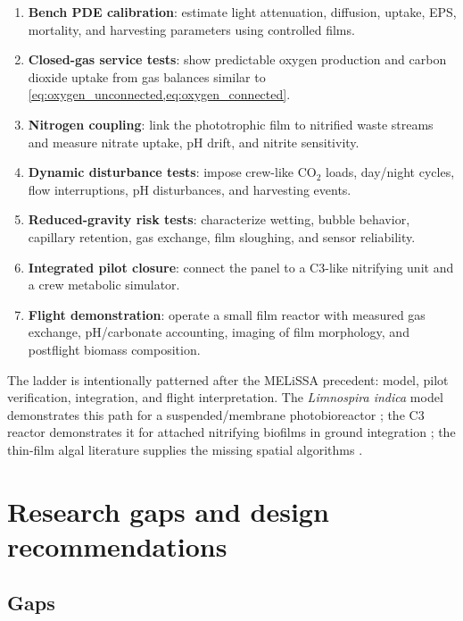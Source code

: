 \documentclass[11pt]{article}
\newcommand{\MEL}{MELiSSA}
\newcommand{\Limno}{\textit{Limnospira indica}}
\begin{document}
\begin{enumerate}
  \item \textbf{Bench PDE calibration}: estimate light attenuation, diffusion, uptake, EPS, mortality, and harvesting parameters using controlled films.
  \item \textbf{Closed-gas service tests}: show predictable oxygen production and carbon dioxide uptake from gas balances similar to \cref{eq:oxygen_unconnected,eq:oxygen_connected}.
  \item \textbf{Nitrogen coupling}: link the phototrophic film to nitrified waste streams and measure nitrate uptake, pH drift, and nitrite sensitivity.
  \item \textbf{Dynamic disturbance tests}: impose crew-like CO$_2$ loads, day/night cycles, flow interruptions, pH disturbances, and harvesting events.
  \item \textbf{Reduced-gravity risk tests}: characterize wetting, bubble behavior, capillary retention, gas exchange, film sloughing, and sensor reliability.
  \item \textbf{Integrated pilot closure}: connect the panel to a C3-like nitrifying unit and a crew metabolic simulator.
  \item \textbf{Flight demonstration}: operate a small film reactor with measured gas exchange, pH/carbonate accounting, imaging of film morphology, and postflight biomass composition.
\end{enumerate}

The ladder is intentionally patterned after the \MEL{} precedent: model, pilot verification, integration, and flight interpretation. The \Limno{} model demonstrates this path for a suspended/membrane photobioreactor \parencite[1, 6, 8--9]{poughon2021}; the C3 reactor demonstrates it for attached nitrifying biofilms in ground integration \parencite[11, 13]{garcia2021}; the thin-film algal literature supplies the missing spatial algorithms \parencite[3--5]{polizzi2022}\parencite[2436--2445]{blanken2014}.

\section{Research gaps and design recommendations}

\subsection{Gaps}
\end{document}
